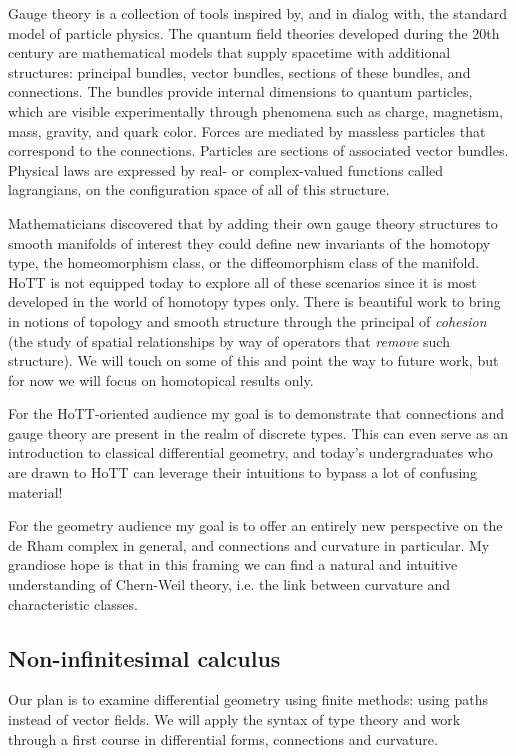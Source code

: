 \documentclass[12pt]{article}
\begin{document}
Gauge theory is a collection of tools inspired by, and in dialog with, the standard model of particle physics. The quantum field theories developed during the 20th century are mathematical models that supply spacetime with additional structures: principal bundles, vector bundles, sections of these bundles, and connections. The bundles provide internal dimensions to quantum particles, which are visible experimentally through phenomena such as charge, magnetism, mass, gravity, and quark color. Forces are mediated by massless particles that correspond to the connections. Particles are sections of associated vector bundles. Physical laws are expressed by real- or complex-valued functions called lagrangians, on the configuration space of all of this structure.

Mathematicians discovered that by adding their own gauge theory structures to smooth manifolds of interest they could define new invariants of the homotopy type, the homeomorphism class, or the diffeomorphism class of the manifold. HoTT is not equipped today to explore all of these scenarios since it is most developed in the world of homotopy types only. There is beautiful work to bring in notions of topology and smooth structure through the principal of \emph{cohesion} (the study of spatial relationships by way of operators that \emph{remove} such structure). We will touch on some of this and point the way to future work, but for now we will focus on homotopical results only. 

For the HoTT-oriented audience my goal is to demonstrate that connections and gauge theory are present in the realm of discrete types. This can even serve as an introduction to classical differential geometry, and today's undergraduates who are drawn to HoTT can leverage their intuitions to bypass a lot of confusing material!

For the geometry audience my goal is to offer an entirely new perspective on the de Rham complex in general, and connections and curvature in particular. My grandiose hope is that in this framing we can find a natural and intuitive understanding of Chern-Weil theory, i.e. the link between curvature and characteristic classes. 


\subsection{Non-infinitesimal calculus}

Our plan is to examine differential geometry using finite methods: using paths instead of vector fields. We will apply the syntax of type theory and work through a first course in differential forms, connections and curvature.
\end{document}
